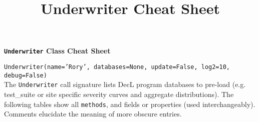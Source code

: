 %
%


\title{Underwriter Cheat Sheet}




{\huge{\bf \textbf{\texttt{Underwriter} Class Cheat Sheet}}}

\raggedright
\texttt{\m Underwriter(name='Rory', databases=None, update=False, log2=10, debug=False)} \\

The \texttt{Underwriter} call signature lists DecL program databases to pre-load (e.g. test\_suite or site specific severity curves and aggregate distributions).
The following tables show all \texttt{\m methods}, and fields or properties (used interchangeably). Comments elucidate the meaning of more obscure entries.


